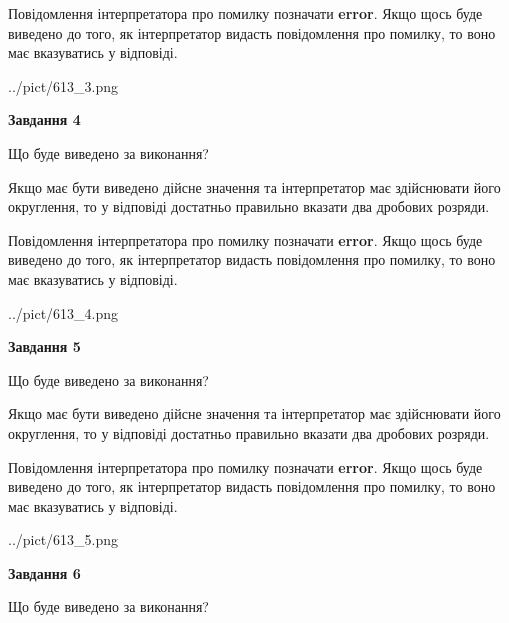 \documentclass[12pt, ukrainian]{article}
\begin{document}
{\begin {Large}
Повідомлення інтерпретатора про помилку позначати \textbf{error}.
Якщо щось буде виведено до того, як інтерпретатор видасть повідомлення про помилку, 
то воно має вказуватись у відповіді. \par

\begin{center}
	{../pict/613_3.png}
\end{center}
\newpage

{\begin {center}\textbf{Завдання 4}\end {center}}\par
Що буде виведено за виконання? \par

Якщо має бути виведено дійсне значення та інтерпретатор має здійснювати його округлення, 
то у відповіді достатньо правильно вказати два дробових розряди.

Повідомлення інтерпретатора про помилку позначати \textbf{error}.
Якщо щось буде виведено до того, як інтерпретатор видасть повідомлення про помилку, 
то воно має вказуватись у відповіді. \par

\begin{center}
	{../pict/613_4.png}
\end{center}
\newpage

{\begin {center}\textbf{Завдання 5}\end {center}}\par
Що буде виведено за виконання? \par

Якщо має бути виведено дійсне значення та інтерпретатор має здійснювати його округлення, 
то у відповіді достатньо правильно вказати два дробових розряди.

Повідомлення інтерпретатора про помилку позначати \textbf{error}.
Якщо щось буде виведено до того, як інтерпретатор видасть повідомлення про помилку, 
то воно має вказуватись у відповіді. \par

\begin{center}
	{../pict/613_5.png}
\end{center}
\newpage

{\begin {center}\textbf{Завдання 6}\end {center}}\par
Що буде виведено за виконання? \par


\end{Large}}
\end{document}
